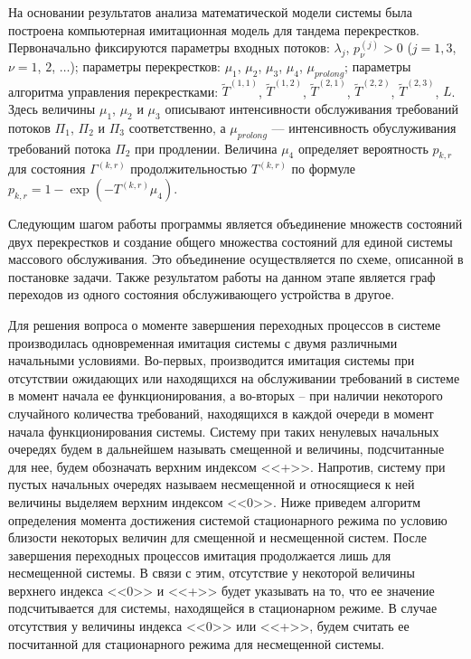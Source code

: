 \documentclass{report}
\begin{document}
На основании результатов анализа математической модели системы была построена компьютерная имитационная модель для тандема перекрестков. Первоначально фиксируются параметры входных потоков:
$\lambda_j$,  $p_{\nu}^{(j)}>0$ ($j=1,3$, $\nu=1$, $2$, $\ldots$); параметры перекрестков: $\mu_1$, $\mu_2$,  $\mu_3$, $\mu_4$, $\mu_{prolong}$; параметры алгоритма управления перекрестками: $\widetilde T^{(1,1)}$, $\widetilde T^{(1,2)}$, $\widetilde T^{(2,1)}$, $\widetilde T^{(2,2)}$, $\widetilde T^{(2,3)}$, $L$. Здесь величины $\mu_1$, $\mu_2$ и $\mu_3$  описывают интенсивности обслуживания требований потоков $\Pi_1$, $\Pi_2$ и $\Pi_3$ соответственно, а $\mu_{prolong}$ --- интенсивность обуслуживания требований потока $\Pi_2$ при продлении. Величина $\mu_4$ определяет вероятность $p_{k,r}$ для состояния $\Gamma^{(k,r)}$ продолжительностью $T^{(k,r)}$ по формуле $p_{k,r} = 1- \exp{(- T^{(k,r)} \mu_4)}$.  

Следующим шагом работы программы является объединение множеств состояний двух перекрестков и создание общего множества состояний для единой системы массового обслуживания. Это объединение осуществляется по схеме, описанной в постановке задачи. Также результатом работы на данном этапе является граф переходов из одного состояния обслуживающего устройства в другое.

Для решения вопроса о моменте завершения переходных процессов в системе производилась одновременная имитация системы с двумя различными начальными условиями. Во-первых, производится имитация системы при отсутствии ожидающих или находящихся на обслуживании требований в системе в момент начала ее функционирования, а во-вторых -- при наличии некоторого случайного количества требований, находящихся в каждой очереди  в момент начала функционирования системы. Систему при таких ненулевых начальных очередях будем в дальнейшем называть смещенной и величины, подсчитанные для нее, будем обозначать верхним индексом <<+>>. Напротив, систему при пустых начальных очередях называем несмещенной и относящиеся к ней величины выделяем верхним индексом <<0>>. Ниже приведем алгоритм определения момента достижения системой стационарного режима по условию близости некоторых величин для смещенной и несмещенной систем. После завершения переходных процессов имитация продолжается лишь для несмещенной системы. В связи с этим, отсутствие у некоторой величины верхнего индекса <<0>> и <<+>> будет указывать на то, что ее значение подсчитывается для системы, находящейся в стационарном режиме. В случае отсутствия у величины индекса <<0>> или <<+>>, будем считать ее посчитанной для стационарного режима для несмещенной системы.
\end{document}
